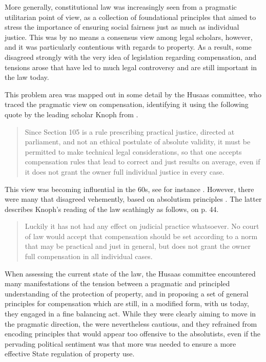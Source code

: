 More generally, constitutional law was increasingly seen from a pragmatic utilitarian point of view, as a collection of foundational principles that aimed to stress the importance of ensuring social fairness just as much as individual justice. This was by no means a consensus view among legal scholars, however, and it was particularly contentious with regards to property. As a result, some disagreed strongly with the very idea of legislation regarding compensation, and tensions arose that have led to much legal controversy and are still important in the law today. 

This problem area was mapped out in some detail by the Husaas committee, who traced the pragmatic view on compensation, identifying it using the following quote by the leading scholar Knoph from \cite[p. 113]{knoph}.

\begin{quote}
Since Section 105 is a rule prescribing practical justice, directed at parliament, and not an ethical postulate of absolute validity, it must be permitted to make technical legal considerations, so that one accepts compensation rules that lead to correct and just results on average, even if it does not grant the owner full individual justice in every case.
\end{quote}

This view was becoming influential in the 60s, see for instance \cite{grunn,opshal}. However, there were many that disagreed vehemently, based on absolutism principles \cite{robb2,schj}. The latter describes Knoph's reading of the law scathingly as follows, on p. 44.

\begin{quote}Luckily it has not had any effect on judicial practice whatsoever. No court of law would accept that compensation should be set according to a norm that may be practical and just in general, but does not grant the owner full compensation in all individual cases.
\end{quote}

When assessing the current state of the law, the Husaas committee encountered many manifestations of the tension between a pragmatic and principled understanding of the protection of property, and in proposing a set of general principles for compensation which are still, in a modified form, with us today, they engaged in a fine balancing act. While they were clearly aiming to move in the pragmatic direction, the were nevertheless cautious, and they refrained from encoding principles that would appear too offensive to the absolutists, even if the pervading political sentiment was that more was needed to ensure a more effective State regulation of property use. 

